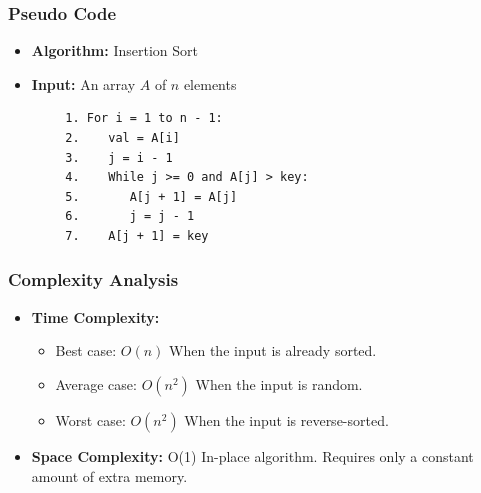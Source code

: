     \subsubsection{Pseudo Code}
        \begin{itemize}
            \item \textbf{Algorithm:} Insertion Sort
            \item \textbf{Input:} An array $A$ of $n$ elements
        \end{itemize}
        \begin{verbatim}
        1. For i = 1 to n - 1:
        2.    val = A[i]
        3.    j = i - 1
        4.    While j >= 0 and A[j] > key:
        5.       A[j + 1] = A[j]
        6.       j = j - 1
        7.    A[j + 1] = key
        \end{verbatim}
    \subsubsection{Complexity Analysis}
        \begin{itemize}
            \item \textbf{Time Complexity:}
            \begin{itemize}
                \item Best case: $O(n)$
                    \subitem When the input is already sorted.
                \item Average case: $O(n^2)$
                    \subitem When the input is random.
                \item Worst case: $O(n^2)$ 
                    \subitem When the input is reverse-sorted.
            \end{itemize}
            \item \textbf{Space Complexity:} O(1) 
                \subitem In-place algorithm. Requires only a constant amount of extra memory.
        \end{itemize}
        

